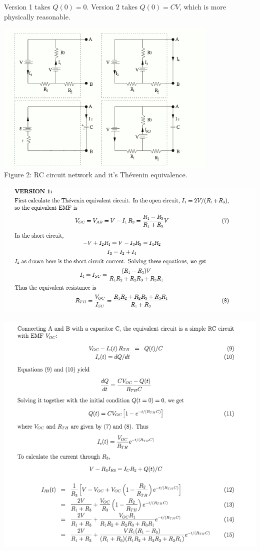 \documentclass[makesolutionspdf]{esg8022pset}
\begin{document}
\begin{solution}
  Version 1 takes $Q(0) = 0$.  Version 2 takes $Q(0) = CV$, which is more physically reasonable.
  \begin{center}
    \includegraphics[width=0.8\textwidth]{ps07_sol_07_1} \\
    Figure 2: RC circuit network and it's Th\'evenin equivalence.
  \end{center}
  \begin{center}\includegraphics[width=\textwidth]{ps07_sol_07_2}\end{center}
  \begin{center}\includegraphics[width=\textwidth]{ps07_sol_07_3}\end{center}

\end{solution}
\end{document}
